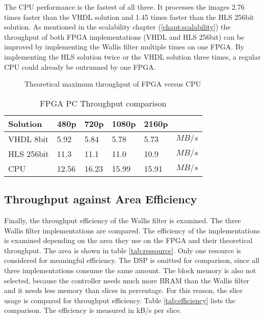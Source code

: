 The CPU performance is the fastest of all three. It processes the images 2.76
times faster than the VHDL solution and 1.45 times faster than the HLS 256bit
solution. As mentioned in the scalability chapter (\ref{chapt:scalability}) the
throughput of both FPGA implementations (VHDL and HLS 256bit) can be improved by
implementing the Wallis filter multiple times on one FPGA. By implementing the
HLS solution twice or the VHDL solution three times, a regular CPU could already
be outrunned by one FPGA.

\begin{figure}[b!]
    \centering
    \begin{adjustbox}{max width=\linewidth}
        
    \end{adjustbox}
    \caption{Theoretical maximum throughput of FPGA versus CPU}
    \label{fig:theoreticalmax}
\end{figure}

\begin{table}[b!]
    \centering
    \begin{tabular}{l l l l l l}
        \toprule
        Solution & 480p & 720p & 1080p & 2160p & \\
        \midrule
        VHDL 8bit       & 5.92  & 5.84  & 5.78  & 5.73  & $MB/s$ \\
        HLS  256bit & 11.3  & 11.1  & 11.0  & 10.9  & $MB/s$ \\
        CPU        & 12.56 & 16.23 & 15.99 & 15.91 & $MB/s$ \\
        \bottomrule
    \end{tabular}
    \caption{FPGA PC Throughput comparison}
    \label{tab:throughputcompare}
\end{table}

\subsection{Throughput against Area Efficiency}
Finally, the throughput efficiency of the Wallis filter is examined. The three
Wallis filter implementations are compared. The efficiency of the
implementations is examined depending on the area they use on the FPGA
and their theoretical throughput. The area is shown in table 
\ref{tab:ressource}. Only one resource is considered for meaningful efficiency.
The DSP is omitted for comparison, since all three implementations consume the
same amount. The block memory is also not selected, because the controller needs
much more BRAM than the Wallis filter and it needs less memory than slices in
percentage. For this reason, the slice usage is compared for throughput
efficiency. Table \ref{tab:efficiency} lists the comparison. The efficiency is
measured in kB/s per slice.
\\

